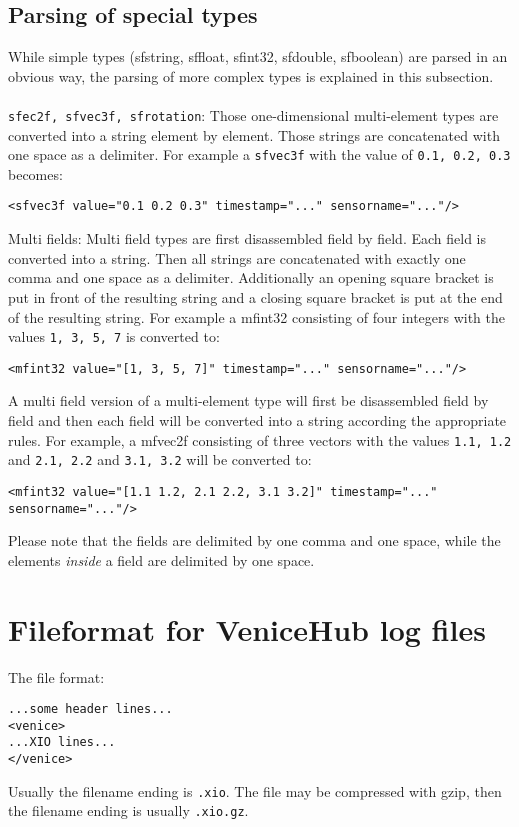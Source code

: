 \documentclass[german,a4paper]{article}
\begin{document}
\subsection{Parsing of special types}
While simple types (sfstring, sffloat, sfint32, sfdouble, sfboolean) are parsed in an obvious way, the parsing of more complex types is explained in this subsection.\\
\\
\texttt{sfec2f, sfvec3f, sfrotation}: Those one-dimensional multi-element types are converted into a string element by element. Those strings are concatenated with one space as a delimiter. For example a \texttt{sfvec3f} with the value of \texttt{0.1, 0.2, 0.3} becomes:
\begin{lstlisting}
<sfvec3f value="0.1 0.2 0.3" timestamp="..." sensorname="..."/>
\end{lstlisting}

Multi fields: Multi field types are first disassembled field by field. Each field is converted into a string. Then all strings are concatenated with exactly one comma and one space as a delimiter. Additionally an opening square bracket is put in front of the resulting string and a closing square bracket is put at the end of the resulting string. For example a mfint32 consisting of four integers with the values \texttt{1, 3, 5, 7} is converted to:
\begin{lstlisting}
<mfint32 value="[1, 3, 5, 7]" timestamp="..." sensorname="..."/>
\end{lstlisting}
A multi field version of a multi-element type will first be disassembled field by field and then each field will be converted into a string according the appropriate rules. For example, a mfvec2f consisting of three vectors with the values \texttt{1.1, 1.2} and \texttt{2.1, 2.2} and \texttt{3.1, 3.2} will be converted to:
\begin{lstlisting}
<mfint32 value="[1.1 1.2, 2.1 2.2, 3.1 3.2]" timestamp="..." sensorname="..."/>
\end{lstlisting}
Please note that the fields are delimited by one comma and one space, while the elements \emph{inside} a field are delimited by one space.

\section{Fileformat for VeniceHub log files}
The file format:
\begin{lstlisting}
...some header lines...
<venice>
...XIO lines...
</venice>
\end{lstlisting}
Usually the filename ending is \texttt{.xio}. The file may be compressed with gzip, then the filename ending is usually \texttt{.xio.gz}.
\end{document}

